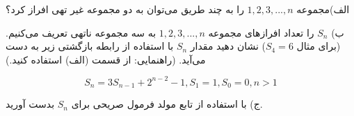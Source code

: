 \EXERCISE
الف)مجموعه
${1, 2, 3, ..., n}$
را به چند طریق می‌توان به دو مجموعه غیر تهی افراز کرد؟

ب)
$S_n$
را تعداد افرازهای مجموعه
${1, 2, 3, ..., n}$
به سه مجموعه ناتهی تعریف می‌کنیم.(برای مثال
$S_4 = 6$) نشان دهید مقدار
$S_n$
با استفاده از رابطه بازگشتی زیر به دست می‌آید.
(راهنمایی: از قسمت (الف) استفاده کنید.)

$$S_n = 3S_{n-1} + 2^{n-2} - 1, S_1 = 1, S_0 = 0, n > 1$$

ج) با استفاده از تابع مولد فرمول صریحی برای
$S_n$
بدست آورید.